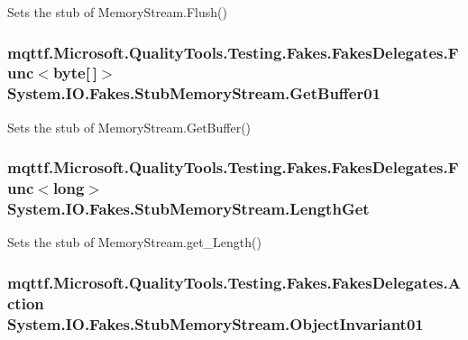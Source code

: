 Sets the stub of Memory\-Stream.\-Flush()

\hypertarget{class_system_1_1_i_o_1_1_fakes_1_1_stub_memory_stream_afab519eb150fbe46c84ee5739be85c54}{
\subsubsection[{Get\-Buffer01}]{\setlength{\rightskip}{0pt plus 5cm}mqttf.\-Microsoft.\-Quality\-Tools.\-Testing.\-Fakes.\-Fakes\-Delegates.\-Func$<$byte\mbox{[}$\,$\mbox{]}$>$ System.\-I\-O.\-Fakes.\-Stub\-Memory\-Stream.\-Get\-Buffer01}}\label{class_system_1_1_i_o_1_1_fakes_1_1_stub_memory_stream_afab519eb150fbe46c84ee5739be85c54}


Sets the stub of Memory\-Stream.\-Get\-Buffer()

\hypertarget{class_system_1_1_i_o_1_1_fakes_1_1_stub_memory_stream_a472810df9b7c4893212b945159067387}{
\subsubsection[{Length\-Get}]{\setlength{\rightskip}{0pt plus 5cm}mqttf.\-Microsoft.\-Quality\-Tools.\-Testing.\-Fakes.\-Fakes\-Delegates.\-Func$<$long$>$ System.\-I\-O.\-Fakes.\-Stub\-Memory\-Stream.\-Length\-Get}}\label{class_system_1_1_i_o_1_1_fakes_1_1_stub_memory_stream_a472810df9b7c4893212b945159067387}


Sets the stub of Memory\-Stream.\-get\-\_\-\-Length()

\hypertarget{class_system_1_1_i_o_1_1_fakes_1_1_stub_memory_stream_af08c8016983d6c15200e037f7e7c4318}{
\subsubsection[{Object\-Invariant01}]{\setlength{\rightskip}{0pt plus 5cm}mqttf.\-Microsoft.\-Quality\-Tools.\-Testing.\-Fakes.\-Fakes\-Delegates.\-Action System.\-I\-O.\-Fakes.\-Stub\-Memory\-Stream.\-Object\-Invariant01}}\label{class_system_1_1_i_o_1_1_fakes_1_1_stub_memory_stream_af08c8016983d6c15200e037f7e7c4318}



